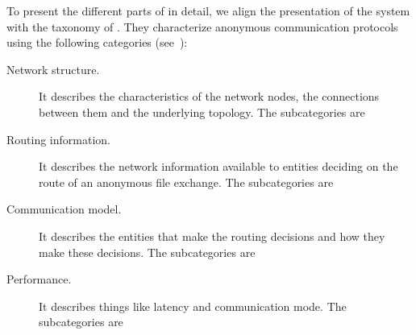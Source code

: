 To present the different parts of \name in detail, 
we align the presentation of the system with the taxonomy of 
\textcite{RoutingSurveyAnonymousProtocols} .
They characterize anonymous communication protocols using the following 
categories (see~\cite[Table 1]{RoutingSurveyAnonymousProtocols}):
\begin{description}
  \item[Network structure.]
    It describes the characteristics of the network nodes, the connections between 
    them and the underlying topology.
    The subcategories are

  \item[Routing information.]
    It describes the network information available to entities deciding on 
    the route of an anonymous file exchange.
    The subcategories are

  \item[Communication model.]
   It describes the entities that make the routing decisions and how they 
    make these decisions.
    The subcategories are

  \item[Performance.]
    It describes things like latency and communication mode.
    The subcategories are
\end{description}

